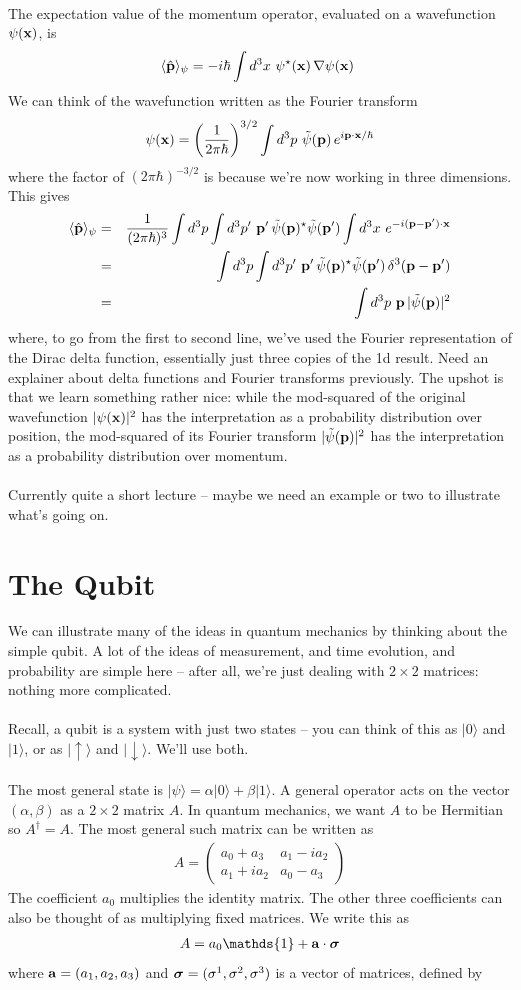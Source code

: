 \documentclass[12pt]{article}
\def\be{\begin{eqnarray}}
\def\ee{\end{eqnarray}}
\newcommand{\nn}{\nonumber}
\newcommand\para{\paragraph{}}
\newcommand\bsigma{\mbox{\boldmath $\sigma$}}
\newcommand{\ket}[1]{|#1\rangle}
\newcommand{\co}{\color{olive}}
\newcommand{\cblue}{\color{blue}}
\newcommand{\cred}{\color{red}}
\newcommand{\bx}{{\bf x}}
\newcommand{\bp}{{\bf p}}
\newcommand{\upket}{|\uparrow\rangle}
\newcommand{\downket}{|\downarrow\rangle}
\begin{document}
{\para
{\co
The expectation value of the momentum operator, evaluated  on a wavefunction $\psi(\bx)$, is 
%
\be \langle \hat{\bp}\rangle_\psi =  -i\hbar\int d^3x\ \psi^\star(\bx)\,\nabla\psi(\bx)\ \nn\ee
%
We can think of the  wavefunction written as the Fourier transform
%
\be \psi(\bx) = \left(\frac{1}{2\pi\hbar}\right)^{3/2} \int d^3p\ \tilde{\psi}(\bp)\,e^{i\bp\cdot\bx/\hbar}\nn\ee
%
} where the factor of $(2\pi\hbar)^{-3/2}$ is because we're now working in three dimensions.  
{\co This gives
%
\be \langle\hat{\bp}\rangle_\psi &=& \frac{1}{(2\pi\hbar)^3}  \int d^3p\int d^3p'\  \bp'\, \tilde{\psi}(\bp)^\star  \tilde{\psi}(\bp') \int d^3x\ e^{-i(\bp-\bp')\cdot\bx}
\nn\\  &=& \int d^3p\int d^3p'\   \bp'\, \tilde{\psi}(\bp)^\star \tilde{\psi}(\bp')\, \delta^3(\bp-\bp')\nn\\ &=& \int d^3p\ \bp\,|\tilde{\psi}(\bp)|^2\nn \ee
%
}
where, to go from the first to second line, we've used the Fourier representation of the Dirac delta function, essentially just three copies of the 1d result. {\cblue Need an explainer about delta functions and Fourier transforms previously.} The upshot is that we learn something rather nice: while the  mod-squared of the original wavefunction $|\psi(\bx)|^2$ has the interpretation as a probability distribution over position, {\co the mod-squared of its Fourier transform $|\tilde{\psi}(\bp)|^2$ has the interpretation  as a probability distribution over momentum.}


\para
{\cred Currently quite a short lecture -- maybe we need an example or two to illustrate what's going on.}

\newpage
\section{The Qubit}

We can illustrate many of the ideas in quantum mechanics by thinking about the simple qubit. A lot of the ideas of measurement, and time evolution, and probability are simple here -- after all, we're just dealing with $2\times 2$ matrices: nothing more complicated. 

\para
{\co Recall, a qubit  is a  system with just two states -- you can think of this as $\ket{0}$ and $\ket{1}$, or as $\upket$ and $\downket$. We'll use both.

\para
The most general state is $\ket{\psi} = \alpha\ket{0} + \beta\ket{1}$. A general operator acts on the vector $(\alpha,\beta)$ as a $2\times 2$ matrix $A$. In quantum mechanics, we want $A$ to be Hermitian so $A^\dagger = A$. The most general such matrix can be written as
%
\be A = \left(\begin{array}{cc} a_0+ a_3 & a_1 - ia_2 \\ a_1+ia_2 & a_0-a_3 \end{array}\right) \nn \ee
%
The coefficient $a_0$ multiplies the identity matrix. The other three coefficients can also be thought of as multiplying fixed matrices. We write this as
%
\be A = a_0\mathds{1} + {\bf a}\cdot \bsigma\nn \ee
%
where  ${\bf a}= (a_1,a_2,a_3)$ and  $\bsigma=(\sigma^1,\sigma^2,\sigma^3)$ is a vector of matrices, defined by

}}
\end{document}
